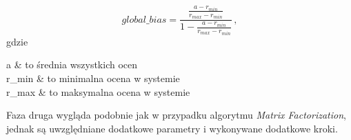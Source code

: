 \documentclass[twoside]{iisthesis}
\begin{document}
		 \begin{equation}
		 \label{eq:global_bias}
		 global\_bias = 
		 \frac
		 { 
		 	\frac{ a - r_{min} }{ r_{max} - r_{min} }
		 }
		 {
		 	1 - \frac{ a - r_{min} }{ r_{max} - r_{min} }	
		 }
		 \,,
		 \end{equation} 		 		
		 gdzie
		 
		 \begin{conditions*}
		 	a & to średnia wszystkich ocen \\
		 	r_{min}  &  to minimalna ocena w systemie  \\
		 	r_{max}  &  to maksymalna ocena w systemie
 		 \end{conditions*} 
		 
		 Faza druga wygląda podobnie jak w przypadku algorytmu \textit{Matrix Factorization}, jednak są uwzględniane dodatkowe parametry i wykonywane dodatkowe kroki.
		 
\end{document}
